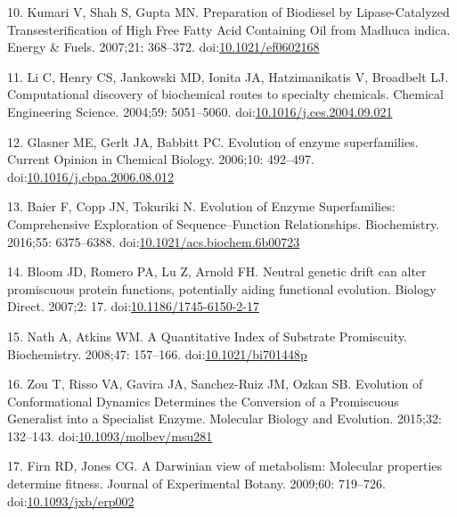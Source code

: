 \documentclass[12pt,twoside]{reedthesis}
\begin{document}
  \hypertarget{ref-kumariux5fpreparationux5f2007}{}
  10. Kumari V, Shah S, Gupta MN. Preparation of Biodiesel by
  Lipase-Catalyzed Transesterification of High Free Fatty Acid Containing
  Oil from Madhuca indica. Energy \& Fuels. 2007;21: 368--372.
  doi:\href{https://doi.org/10.1021/ef0602168}{10.1021/ef0602168}
  
  \hypertarget{ref-liux5fcomputationalux5f2004}{}
  11. Li C, Henry CS, Jankowski MD, Ionita JA, Hatzimanikatis V, Broadbelt
  LJ. Computational discovery of biochemical routes to specialty
  chemicals. Chemical Engineering Science. 2004;59: 5051--5060.
  doi:\href{https://doi.org/10.1016/j.ces.2004.09.021}{10.1016/j.ces.2004.09.021}
  
  \hypertarget{ref-glasnerux5fevolutionux5f2006}{}
  12. Glasner ME, Gerlt JA, Babbitt PC. Evolution of enzyme superfamilies.
  Current Opinion in Chemical Biology. 2006;10: 492--497.
  doi:\href{https://doi.org/10.1016/j.cbpa.2006.08.012}{10.1016/j.cbpa.2006.08.012}
  
  \hypertarget{ref-baierux5fevolutionux5f2016}{}
  13. Baier F, Copp JN, Tokuriki N. Evolution of Enzyme Superfamilies:
  Comprehensive Exploration of Sequence--Function Relationships.
  Biochemistry. 2016;55: 6375--6388.
  doi:\href{https://doi.org/10.1021/acs.biochem.6b00723}{10.1021/acs.biochem.6b00723}
  
  \hypertarget{ref-bloomux5fneutralux5f2007}{}
  14. Bloom JD, Romero PA, Lu Z, Arnold FH. Neutral genetic drift can
  alter promiscuous protein functions, potentially aiding functional
  evolution. Biology Direct. 2007;2: 17.
  doi:\href{https://doi.org/10.1186/1745-6150-2-17}{10.1186/1745-6150-2-17}
  
  \hypertarget{ref-nathux5fquantitativeux5f2008}{}
  15. Nath A, Atkins WM. A Quantitative Index of Substrate Promiscuity.
  Biochemistry. 2008;47: 157--166.
  doi:\href{https://doi.org/10.1021/bi701448p}{10.1021/bi701448p}
  
  \hypertarget{ref-zouux5fevolutionux5f2015}{}
  16. Zou T, Risso VA, Gavira JA, Sanchez-Ruiz JM, Ozkan SB. Evolution of
  Conformational Dynamics Determines the Conversion of a Promiscuous
  Generalist into a Specialist Enzyme. Molecular Biology and Evolution.
  2015;32: 132--143.
  doi:\href{https://doi.org/10.1093/molbev/msu281}{10.1093/molbev/msu281}
  
  \hypertarget{ref-firnux5fdarwinianux5f2009}{}
  17. Firn RD, Jones CG. A Darwinian view of metabolism: Molecular
  properties determine fitness. Journal of Experimental Botany. 2009;60:
  719--726.
  doi:\href{https://doi.org/10.1093/jxb/erp002}{10.1093/jxb/erp002}
  
\end{document}
